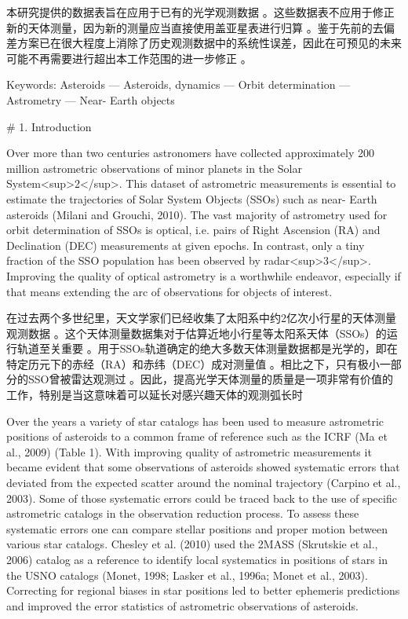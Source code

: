 本研究提供的数据表旨在应用于已有的光学观测数据 。这些数据表不应用于修正新的天体测量，因为新的测量应当直接使用盖亚星表进行归算 。鉴于先前的去偏差方案已在很大程度上消除了历史观测数据中的系统性误差，因此在可预见的未来可能不再需要进行超出本工作范围的进一步修正 。

Keywords: Asteroids — Asteroids, dynamics — Orbit determination — Astrometry — Near- Earth objects

# 1. Introduction

Over more than two centuries astronomers have collected approximately 200 million astrometric observations of minor planets in the Solar System<sup>2</sup>. This dataset of astrometric measurements is essential to estimate the trajectories of Solar System Objects (SSOs) such as near- Earth asteroids (Milani and Grouchi, 2010). The vast majority of astrometry used for orbit determination of SSOs is optical, i.e. pairs of Right Ascension (RA) and Declination (DEC) measurements at given epochs. In contrast, only a tiny fraction of the SSO population has been observed by radar<sup>3</sup>. Improving the quality of optical astrometry is a worthwhile endeavor, especially if that means extending the arc of observations for objects of interest. 

在过去两个多世纪里，天文学家们已经收集了太阳系中约2亿次小行星的天体测量观测数据 。这个天体测量数据集对于估算近地小行星等太阳系天体（SSOs）的运行轨道至关重要 。用于SSOs轨道确定的绝大多数天体测量数据都是光学的，即在特定历元下的赤经（RA）和赤纬（DEC）成对测量值 。相比之下，只有极小一部分的SSO曾被雷达观测过 。因此，提高光学天体测量的质量是一项非常有价值的工作，特别是当这意味着可以延长对感兴趣天体的观测弧长时 

Over the years a variety of star catalogs has been used to measure astrometric positions of asteroids to a common frame of reference such as the ICRF (Ma et al., 2009) (Table 1). With improving quality of astrometric measurements it became evident that some observations of asteroids showed systematic errors that deviated from the expected scatter around the nominal trajectory (Carpino et al., 2003). Some of those systematic errors could be traced back to the use of specific astrometric catalogs in the observation reduction process. To assess these systematic errors one can compare stellar positions and proper motion between various star catalogs. Chesley et al. (2010) used the 2MASS (Skrutskie et al., 2006) catalog as a reference to identify local systematics in positions of stars in the USNO catalogs (Monet, 1998; Lasker et al., 1996a; Monet et al., 2003). Correcting for regional biases in star positions led to better ephemeris predictions and improved the error statistics of astrometric observations of asteroids.

